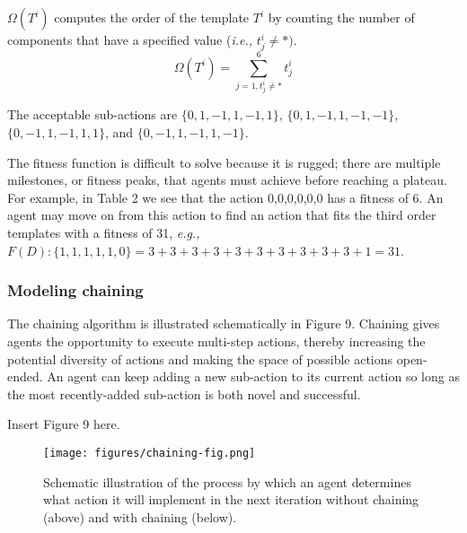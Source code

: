 \documentclass[a4paper,12pt,man,british]{apa6}
\begin{document}
$\Omega(T^i)$ computes the order of the template $T^i$ by counting the number of components that have a specified value (\emph{i.e.,} $t_j^i \neq *)$.
\begin{equation}
\Omega(T^i)= \sum_{j=1, t_j^i \neq *}^6{t_j^i}
\label{eq:template order}
\end{equation}

\bigskip \noindent The 
acceptable sub-actions are $\{0,1,-1,1,-1,1\}$, $\{0,1,-1,1,-1,-1\}$, $\{0,-1,1,-1,1,1\}$, and  $\{0,-1,1,-1,1,-1\}$.

\bigskip \indent The fitness function is difficult to solve because it is rugged; there are multiple milestones, or fitness peaks, that agents must achieve before reaching a plateau. For example, in Table 2 we see that the action {0,0,0,0,0,0} has a fitness of 6. An agent may move on from this action to find an action that fits the third order templates with a fitness of 31, {\it e.g.,} $F(D):\{1,1,1,1,1,0\}=3+3+3+3+3+3+3+3+3+3+1=31$. 

\bigskip 
\subsubsection{Modeling chaining}
The chaining algorithm is illustrated schematically in Figure 9.
Chaining gives agents the opportunity to execute multi-step actions, thereby increasing the potential diversity of actions and making the space of possible actions open-ended. An agent can keep adding a new sub-action to its current action so long as the most recently-added sub-action is both novel and successful. 

\bigskip 
\begin{center}
Insert Figure 9 here. %
\end{center}

\begin{figure} %
\linespread{2}
\centering
\texttt{[image: figures/chaining-fig.png]} \\
 \begin{center} 
\caption{Schematic illustration of the process by which an agent determines what action it will implement in the next iteration without chaining (above) and with chaining (below).}
 \end{center} 
\label{fig:chaining-fig}
\end{figure}
\end{document}
